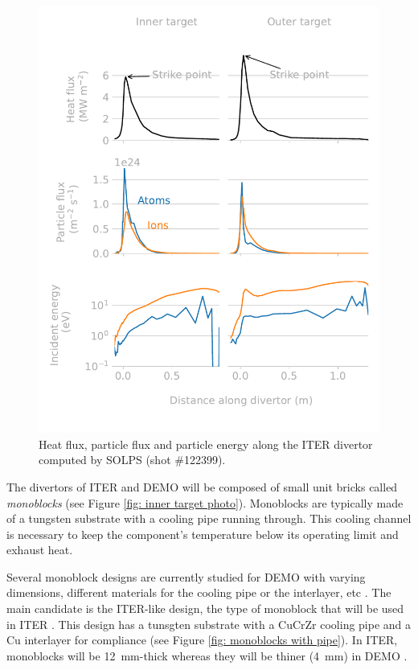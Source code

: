 \begin{figure} [h]
    \centering
    \includegraphics[width=\linewidth]{Figures/Chapter1/divertor_exposure_conditions.pdf}
    \caption{Heat flux, particle flux and particle energy along the ITER divertor computed by SOLPS (shot \#122399).}
\end{figure}

The divertors of ITER and DEMO will be composed of small unit bricks called \textit{monoblocks} (see Figure \ref{fig: inner target photo}).
Monoblocks are typically made of a tungsten substrate with a cooling pipe running through.
This cooling channel is necessary to keep the component's temperature below its operating limit and exhaust heat.

Several monoblock designs are currently studied for DEMO with varying dimensions, different materials for the cooling pipe or the interlayer, etc .
The main candidate is the ITER-like design, the type of monoblock that will be used in ITER \cite{hirai_use_2016}.
This design has a tunsgten substrate with a CuCrZr cooling pipe and a Cu interlayer for compliance (see Figure \ref{fig: monoblocks with pipe}).
In ITER, monoblocks will be \SI{12}{mm}-thick whereas they will be thiner (\SI{4}{mm}) in DEMO .

